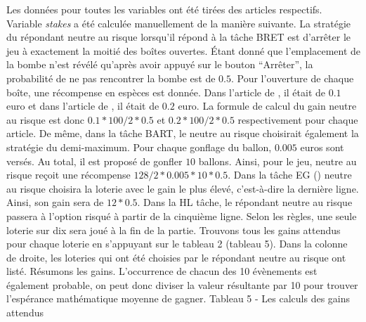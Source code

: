 \documentclass[12pt]{article}
\begin{document}
Les données pour toutes les variables ont été tirées des articles
respectifs. Variable \emph{stakes} a été calculée manuellement de la
manière suivante. La stratégie du répondant neutre au risque lorsqu'il
répond à la tâche BRET est d'arrêter le jeu à exactement la moitié des
boîtes ouvertes. Étant donné que l'emplacement de la bombe n'est révélé
qu'après avoir appuyé sur le bouton ``Arrêter'', la probabilité de ne
pas rencontrer la bombe est de \(0.5\). Pour l'ouverture de chaque
boîte, une récompense en espèces est donnée. Dans l'article de
\citet{Crosetto2013}, il était de \(0.1\) euro et dans l'article de
\citet{Crosetto2016}, il était de \(0.2\) euro. La formule de calcul du
gain neutre au risque est donc \(0.1 * 100 / 2 * 0.5\) et
\(0.2 * 100 / 2 * 0.5\) respectivement pour chaque article. De même,
dans la tâche BART, le neutre au risque choisirait également la
stratégie du demi-maximum. Pour chaque gonflage du ballon, \(0.005\)
euros sont versés. Au total, il est proposé de gonfler \(10\) ballons.
Ainsi, pour le jeu, neutre au risque reçoit une récompense
\(128 / 2 * 0.005 * 10 * 0.5\). Dans la tâche EG (\citet{Crosetto2016})
neutre au risque choisira la loterie avec le gain le plus élevé,
c'est-à-dire la dernière ligne. Ainsi, son gain sera de \(12 * 0.5\).
Dans la HL tâche, le répondant neutre au risque passera à l'option
risqué à partir de la cinquième ligne. Selon les règles, une seule
loterie sur dix sera joué à la fin de la partie. Trouvons tous les gains
attendus pour chaque loterie en s'appuyant sur le tableau 2 (tableau 5).
Dans la colonne de droite, les loteries qui ont été choisies par le
répondant neutre au risque ont listé. Résumons les gains. L'occurrence
de chacun des 10 évènements est également probable, on peut donc diviser
la valeur résultante par 10 pour trouver l'espérance mathématique
moyenne de gagner. \newpage Tableau 5 - Les calculs des gains attendus
\end{document}
